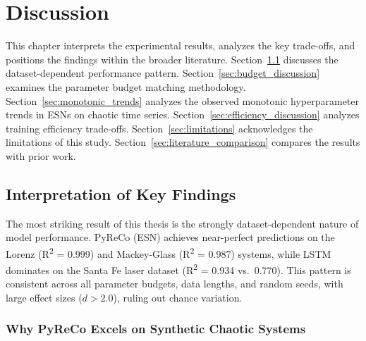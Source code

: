 \section{Discussion\label{chapter5}}

This chapter interprets the experimental results, analyzes the key trade-offs, and positions the findings within the broader literature. Section~\ref{sec:key_findings} discusses the dataset-dependent performance pattern. Section~\ref{sec:budget_discussion} examines the parameter budget matching methodology. Section~\ref{sec:monotonic_trends} analyzes the observed monotonic hyperparameter trends in ESNs on chaotic time series. Section~\ref{sec:efficiency_discussion} analyzes training efficiency trade-offs. Section~\ref{sec:limitations} acknowledges the limitations of this study. Section~\ref{sec:literature_comparison} compares the results with prior work.

\subsection{Interpretation of Key Findings}
\label{sec:key_findings}

The most striking result of this thesis is the strongly dataset-dependent nature of model performance. PyReCo (ESN) achieves near-perfect predictions on the Lorenz (R\textsuperscript{2} = 0.999) and Mackey-Glass (R\textsuperscript{2} = 0.987) systems, while LSTM dominates on the Santa Fe laser dataset (R\textsuperscript{2} = 0.934 vs.\ 0.770). This pattern is consistent across all parameter budgets, data lengths, and random seeds, with large effect sizes ($d > 2.0$), ruling out chance variation.

\subsubsection{Why PyReCo Excels on Synthetic Chaotic Systems}

